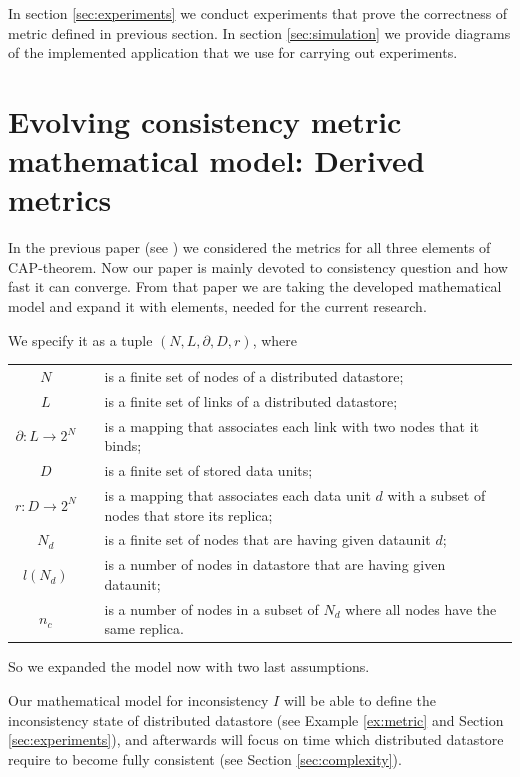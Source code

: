 \documentclass[a4paper,14pt]{llncs}
\begin{document}
In section \ref{sec:experiments} we conduct experiments that prove the correctness of metric defined in previous section.
In section \ref{sec:simulation} we provide diagrams of the implemented application that we use for carrying out experiments.

\section{Evolving consistency metric mathematical model: Derived metrics}\label{sec:model}


In the previous paper (see \cite{bib:prob_approach}) we considered the metrics for all three elements of CAP-theorem.
Now our paper is mainly devoted to consistency question and how fast it can converge.
From that paper we are taking the developed mathematical model and expand it with elements, needed for the current research.

We specify it as a tuple $(N, L, \partial,D, r)$, where \\
\begin{tabular*}{\textwidth}{cp{0.5cm}p{}}
$N$&& is a finite set of nodes of a distributed datastore; \\
$L$&& is a finite set of links of a distributed datastore; \\
$\partial:L\rightarrow 2^N$&& is a mapping that associates each link with two nodes that it binds;\\
$D$&& is a finite set of stored data units;\\
$r:D\rightarrow 2^N$&& is a mapping that associates each data unit $d$ with a subset of nodes 
that store its replica; \\


$N_d$&& is a finite set of nodes that are having given dataunit $d$; \\
$l(N_d)$&& is a number of nodes in datastore that are having given dataunit; \\
$n_c$&& is a number of nodes in a subset of $N_d$ where all nodes have the same replica.
\end{tabular*}

So we expanded the model now with two last assumptions.

Our mathematical model for inconsistency $I$ will be able to define the inconsistency state of distributed datastore (see Example \ref{ex:metric} and Section \ref{sec:experiments}), and afterwards will focus on time which distributed datastore require to become fully consistent (see Section \ref{sec:complexity}).
\end{document}
